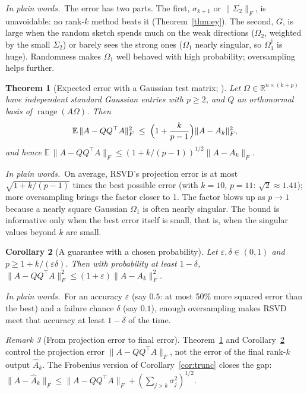 \documentclass[10pt]{article}
\theoremstyle{plain}
\newtheorem{theorem}{Theorem}[section]
\newtheorem{corollary}[theorem]{Corollary}
\theoremstyle{definition}
\theoremstyle{remark}
\newtheorem{remark}[theorem]{Remark}
\newcommand{\R}{\mathbb{R}}
\newcommand{\E}{\mathbb{E}}
\newcommand{\T}{^{\top}}
\newcommand{\fro}[1]{\lVert #1\rVert_F}
\DeclareMathOperator{\range}{range}
\newcommand{\plain}{\noindent\emph{In plain words.}\ }
\begin{document}
\plain The error has two parts. The first, $\sigma_{k+1}$ or $\fro{\Sigma_2}$, is unavoidable: no rank-$k$ method beats it (Theorem~\ref{thm:ey}). The second, $G$, is large when the random sketch spends much on the weak directions ($\Omega_2$, weighted by the small $\Sigma_2$) or barely sees the strong ones ($\Omega_1$ nearly singular, so $\Omega_1^\dagger$ is huge). Randomness makes $\Omega_1$ well behaved with high probability; oversampling helps further.

\begin{theorem}[Expected error with a Gaussian test matrix; {\cite[Thm.~10.5]{halko2011}}]\label{thm:exp}
Let $\Omega\in\R^{n\times(k+p)}$ have independent standard Gaussian entries with $p\ge2$, and $Q$ an orthonormal basis of $\range(A\Omega)$. Then
\[
\E\,\fro{A-QQ\T A}^2\;\le\;\Bigl(1+\frac{k}{p-1}\Bigr)\fro{A-A_k}^2,
\]
and hence $\E\,\fro{A-QQ\T A}\le(1+k/(p-1))^{1/2}\fro{A-A_k}$.
\end{theorem}

\plain On average, RSVD's projection error is at most $\sqrt{1+k/(p-1)}$ times the best possible error (with $k=10$, $p=11$: $\sqrt2\approx1.41$); more oversampling brings the factor closer to 1. The factor blows up as $p\to1$ because a nearly square Gaussian $\Omega_1$ is often nearly singular. The bound is informative only when the best error itself is small, that is, when the singular values beyond $k$ are small.

\begin{corollary}[A guarantee with a chosen probability]\label{cor:epsdelta}
Let $\varepsilon,\delta\in(0,1)$ and $p\ge1+k/(\varepsilon\delta)$. Then with probability at least $1-\delta$, $\fro{A-QQ\T A}^2\le(1+\varepsilon)\fro{A-A_k}^2$.
\end{corollary}

\plain For an accuracy $\varepsilon$ (say $0.5$: at most 50\% more squared error than the best) and a failure chance $\delta$ (say $0.1$), enough oversampling makes RSVD meet that accuracy at least $1-\delta$ of the time.

\begin{remark}[From projection error to final error]\label{rem:projfinal}
Theorem~\ref{thm:exp} and Corollary~\ref{cor:epsdelta} control the projection error $\fro{A-QQ\T A}$, not the error of the final rank-$k$ output $\hat A_k$. The Frobenius version of Corollary~\ref{cor:trunc} closes the gap: $\fro{A-\hat A_k}\le\fro{A-QQ\T A}+(\sum_{j>k}\sigma_j^2)^{1/2}$.
\end{remark}
\end{document}

